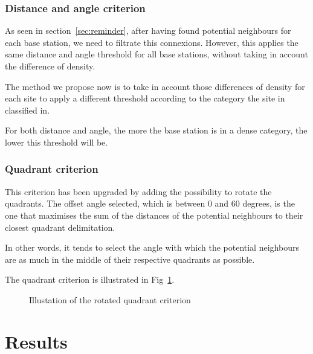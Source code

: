 \documentclass[lettersize,journal,english]{IEEEtran}
\begin{document}
        \subsubsection{Distance and angle criterion}
            As seen in section~\ref{sec:reminder}, after having found potential neighbours for each base station, we need to filtrate this connexions. However, this applies the same distance and angle threshold for all base stations, without taking in account the difference of density.

            The method we propose now is to take in account those differences of density for each site to apply a different threshold according to the category the site in classified in.

            For both distance and angle, the more the base station is in a dense category, the lower this threshold will be.

        \subsubsection{Quadrant criterion}
            This criterion has been upgraded by adding the possibility to rotate the quadrants. The offset angle selected, which is between $0$ and $60$ degrees, is the one that maximises the sum of the distances of the potential neighbours to their closest quadrant delimitation.

            In other words, it tends to select the angle with which the potential neighbours are as much in the middle of their respective quadrants as possible.

            The quadrant criterion is illustrated in Fig~\ref{fig:crit_qua}.
            \begin{figure}
                \centering
                \caption{Illustation of the rotated quadrant criterion}
                \label{fig:crit_qua}
            \end{figure}

\section{Results}
\end{document}
